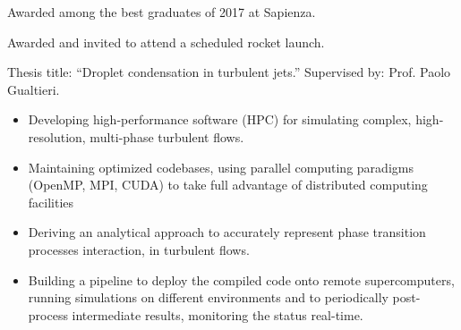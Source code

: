
	\bigskip

	\begin{paracol}{2}


		Awarded among the best graduates of 2017 at Sapienza.

		\bigskip

		Awarded and invited to attend a scheduled rocket launch.

		\switchcolumn


		
		\bigskip


	\end{paracol}
\else
\fi

\bigskip


\iflongversion

	Thesis title: ``Droplet condensation in turbulent jets.'' Supervised by: Prof. Paolo Gualtieri. \\
	\smallskip
	\begin{itemize}
		\item Developing high-performance software (HPC) for simulating complex, high-resolution, multi-phase turbulent flows.
		\item Maintaining optimized codebases, using parallel computing paradigms (OpenMP, MPI, CUDA) to take full advantage of distributed computing facilities
		\item Deriving an analytical approach to accurately represent phase transition processes interaction, in turbulent flows.
		\item Building a pipeline to deploy the compiled code onto remote supercomputers, running simulations on different environments and to periodically post-process intermediate results, monitoring the status real-time.
	\end{itemize}
	\medskip
	\
	\medskip

